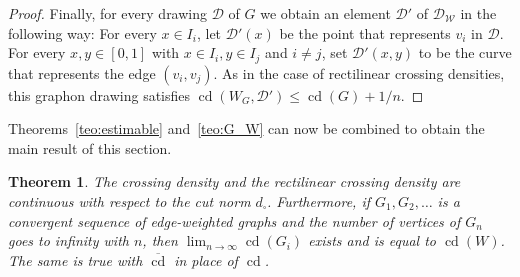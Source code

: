 \documentclass{article}
\newcounter{contSect} \numberwithin{contSect}{section}
\newtheorem{theorem}[contSect]{Theorem}
\begin{document}
\begin{proof}
    Finally, for every drawing $\mathcal{D}$ of $G$ we obtain an element $\mathcal{D}'$ of $\mathcal{D}_\mathcal{W}$ in the following way: For every $x\in I_i$, let $\mathcal D'(x)$ be the point that represents $v_i$ in $\mathcal D$. For every $x,y\in[0,1]$ with $x\in I_i, y\in I_j$ and $i\neq j$, set $\mathcal{D}'(x,y)$ to be the curve that represents the edge $(v_i,v_j)$. As in the case of rectilinear crossing densities, this graphon drawing satisfies $\mathop{\mathrm{cd}}(W_G,\mathcal{D}')\leq\mathop{\mathrm{cd}}(G)+1/n$.
\end{proof}

Theorems~\ref{teo:estimable} and~\ref{teo:G_W} can now be combined to obtain the main result of this section.

\begin{theorem}\label{teo:continuous}
     The crossing density and the rectilinear crossing density are continuous with respect to the cut norm $d_\square$. Furthermore, if $G_1,G_2,\dots$ is a convergent sequence of edge-weighted graphs and the number of vertices of $G_n$ goes to infinity with $n$, then $\lim_{n\rightarrow\infty}\mathop{\mathrm{cd}}(G_i)$ exists and is equal to $\mathop{\mathrm{cd}}(W)$. The same is true with $\overline{\mathop{\mathrm{cd}}}$ in place of $\mathop{\mathrm{cd}}$.
    \end{theorem}
\end{document}
